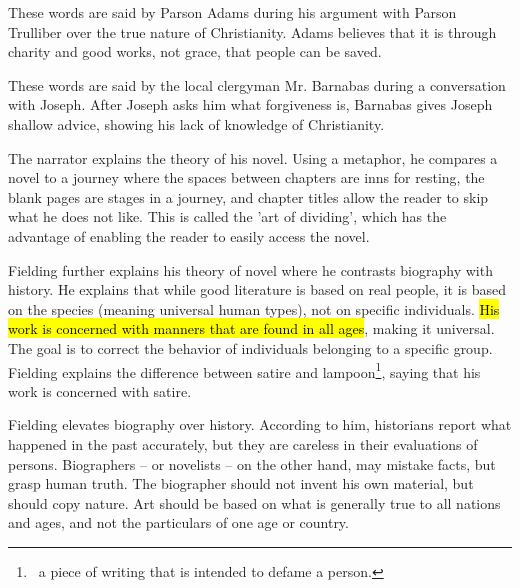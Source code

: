 \documentclass[12pt, a4paper]{article}
\begin{document}


These words are said by Parson Adams during his argument with Parson Trulliber over 
the true nature of Christianity. Adams believes that it is through charity and good works, not 
grace, that people can be saved.



These words are said by the local clergyman  Mr. Barnabas during a conversation with Joseph.
After Joseph asks him what forgiveness is, Barnabas gives Joseph shallow advice, showing
his lack of knowledge of Christianity.



\ind The narrator explains the theory of his novel. Using a metaphor, he compares
a novel to a journey where the spaces between chapters are inns for resting, the blank
pages are stages in a journey, and chapter titles allow the reader to skip what he does
not like. This is called the 'art of dividing', which has the advantage of enabling 
the reader to easily access the novel.

\enlargethispage{\baselineskip}

\ind Fielding further explains his theory of novel where he contrasts biography 
with history. He explains that while good literature is based on real people,
it is based on the species (meaning universal human types), not on specific
individuals. \hl{His work is concerned with manners
that are found in all ages}, making it universal.
The goal is to correct the behavior of individuals belonging to a specific group.
Fielding explains the difference between satire and lampoon\footnote{\,
a piece of writing that is intended to defame a person.}, saying that his work 
is concerned with satire.


\ind Fielding elevates biography over history. According to him, historians report what
happened in the past accurately, but they are careless in their evaluations of
persons. Biographers -- or novelists -- on the other hand, may mistake
facts, but grasp human truth. The biographer should not
invent his own material, but should copy nature. Art should be based
on what is generally true to all nations and ages, and not the particulars
of one age or country.
\end{document}
